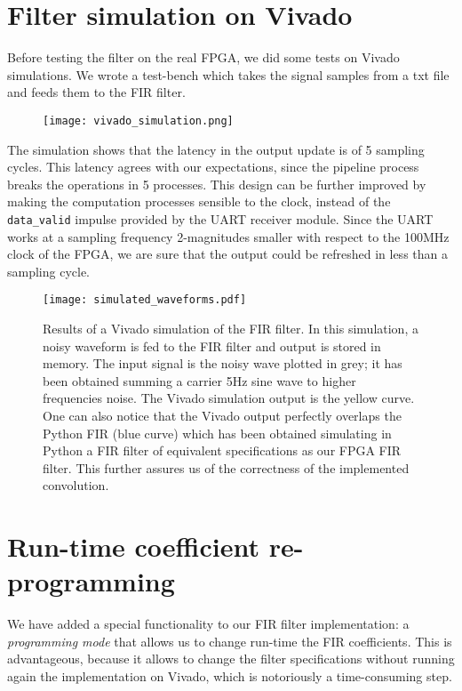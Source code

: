 \section{Filter simulation on Vivado}
\label{sec:simulations}

Before testing the filter on the real FPGA, we did some tests on Vivado simulations. We wrote a test-bench which takes the signal samples from a txt file and feeds them to the FIR filter. 

\begin{figure}[H]
    \centering
    \label{fig:simulator}
    \texttt{[image: vivado\_simulation.png]}
    \qquad
\end{figure}

The simulation shows that the latency in the output update is of 5 sampling cycles. This latency agrees with our expectations, since the pipeline process breaks the operations in 5 processes. This design can be further improved by making the computation processes sensible to the clock, instead of the \texttt{data\_valid} impulse provided by the UART receiver module. Since the UART works at a sampling frequency 2-magnitudes smaller with respect to the 100MHz clock of the FPGA, we are sure that the output could be refreshed in less than a sampling cycle.

\begin{figure}[H]
    \centering
    \label{fig:simulated_waveform}
    \caption{Results of a Vivado simulation of the FIR filter. In this simulation, a noisy waveform is fed to the FIR filter and output is stored in memory. The input signal is the noisy wave plotted in grey; it has been obtained summing a carrier 5Hz sine wave to higher frequencies noise. The Vivado simulation output is the yellow curve. One can also notice that the Vivado output perfectly overlaps the Python FIR (blue curve) which has been obtained simulating in Python a FIR filter of equivalent specifications as our FPGA FIR filter. This further assures us of the correctness of the implemented convolution.}
    \texttt{[image: simulated\_waveforms.pdf]}
    \qquad
\end{figure}

\section{Run-time coefficient re-programming}
\label{sec:real_time}

We have added a special functionality to our FIR filter implementation: a \emph{programming mode} that allows us to change run-time the FIR coefficients. This is advantageous, because it allows to change the filter specifications without running again the implementation on Vivado, which is notoriously a time-consuming step. 

